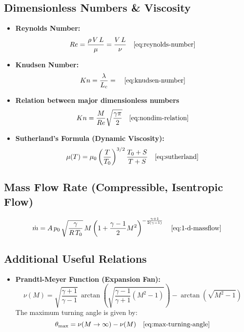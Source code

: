 \subsection*{Dimensionless Numbers \& Viscosity}
\begin{itemize}
    \item \textbf{Reynolds Number:}  
    $$
	    Re = \frac{\rho\,V\,L}{\mu} = \frac{V\,L}{\nu} \quad \eqref{eq:reynolds-number}
    $$
    \item \textbf{Knudsen Number:}  
    $$
	    Kn = \frac{\lambda}{L_c} = \quad \eqref{eq:knudsen-number}
    $$
	\item \textbf{Relation between major dimensionless numbers}
	$$
		Kn = \frac{M}{Re}\sqrt{\frac{\gamma \pi}{2}} \quad \eqref{eq:nondim-relation}
	$$
    \item \textbf{Sutherland’s Formula (Dynamic Viscosity):}  
    $$
	    \mu(T) = \mu_0\left(\frac{T}{T_0}\right)^{3/2}\frac{T_0+S}{T+S} \quad \eqref{eq:sutherland}
    $$
\end{itemize}

\subsection*{Mass Flow Rate (Compressible, Isentropic Flow)}
$$
	\dot{m} = A\,p_0\,\sqrt{\frac{\gamma}{R\,T_0}}\,M\left(1+\frac{\gamma-1}{2}M^2\right)^{-\frac{\gamma+1}{2(\gamma-1)}} \quad \eqref{eq:1-d-massflow}
$$

\subsection*{Additional Useful Relations}
\begin{itemize}
    \item \textbf{Prandtl-Meyer Function (Expansion Fan):}  
    $$
    \nu(M) = \sqrt{\frac{\gamma+1}{\gamma-1}}\,\arctan\!\left(\sqrt{\frac{\gamma-1}{\gamma+1}(M^2-1)}\right) - \arctan\!\left(\sqrt{M^2-1}\right)
    $$
    The maximum turning angle is given by:
    $$
	    \theta_{\text{max}} = \nu(M\to\infty) - \nu(M) \quad \eqref{eq:max-turning-angle}
    $$
\end{itemize}
